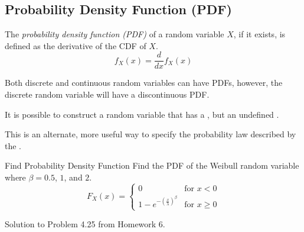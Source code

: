 	\subsection{Probability Density Function (PDF)} \label{subsec:Probability Density Function}
		\begin{definition} \label{def:Probability Density Function}
			The \emph{probability density function (PDF)} of a random variable $X$, if it exists, is defined as the derivative of the CDF of $X$.
			\begin{equation} \label{eq:Probability Density Function}
				f_{X} \left( x \right) = \frac{d}{dx} f_{X} \left( x \right)
			\end{equation}
			\begin{remark} \label{rmk:Probability Density Function}
				Both discrete and continuous random variables can have PDFs, however, the discrete random variable will have a discontinuous PDF.
			\end{remark}
			\begin{remark} \label{rmk:Probability Density Function Construction}
				It is possible to construct a random variable that has a , but an undefined .
			\end{remark}
			\begin{remark}
				This is an alternate, more useful way to specify the probability law described by the .
			\end{remark}
		\end{definition}
		\begin{example}[Problem 4.25]{Find Probability Density Function}
			Find the PDF of the Weibull random variable where $\beta = 0.5$, $1$, and $2$.
			\begin{equation*}
				F_{X} \left( x \right) = \begin{cases}
					0 & \text{for } x<0 \\
					1-e^{-\left(\frac{x}{\lambda}\right)^{\beta}} & \text{for } x \geq 0
				\end{cases}
			\end{equation*}
			
			\tcblower
			
			Solution to Problem 4.25 from Homework 6.
		\end{example}
	
